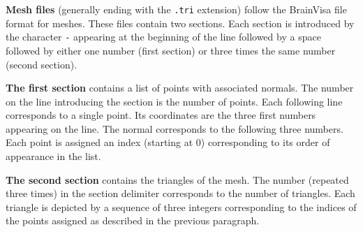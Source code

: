 \documentclass[10pt,journal]{book}
\newcommand{\example}[1]{\framebox[0.95\linewidth][l]{\parbox[t]{.93\linewidth}{\ttfamily \tiny #1}}}
\begin{document}
%



    \bigskip

    {\bf Mesh files} (generally ending with the {\tt .tri} extension) follow the BrainVisa file format for meshes. These files contain two sections. Each section is
    introduced by the character {\tt -} appearing at the beginning of the line followed by a space followed by either one number (first section) or three times
    the same number (second section).

    \medskip

    {\bf The first section} contains a list of points with associated normals. The number on the line introducing the section is the number of points.
    Each following line corresponds to a single point. Its coordinates are the three first numbers appearing on the line. The normal corresponds
    to the following three numbers. Each point is assigned an index (starting at 0) corresponding to its order of appearance in the list.

    \medskip

    {\bf The second section} contains the triangles of the mesh. The number (repeated three times) in the section delimiter corresponds to the number of triangles.
    Each triangle is depicted by a sequence of three integers corresponding to the indices of the points assigned as described in the previous paragraph.
\end{document}
